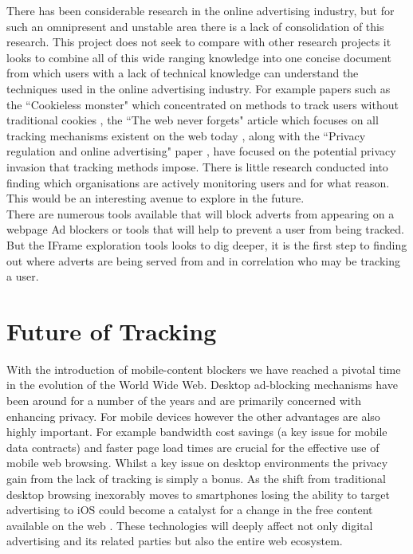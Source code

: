 \documentclass[12pt]{article}
\begin{document}
There has been considerable research in the online advertising industry, but for such an omnipresent and unstable area there is a lack of consolidation of this research. This project does not seek to compare with other research projects it looks to combine all of this wide ranging knowledge into one concise document from which users with a lack of technical knowledge can understand the techniques used in the online advertising industry. For example papers such as the ``Cookieless monster" which concentrated on methods to track users without traditional cookies \parencite{cookielessMonster}, the ``The web never forgets" article which focuses on all tracking mechanisms existent on the web today \parencite{webNeverForgets}, along with the ``Privacy regulation and online advertising" paper \parencite{goldfarb2011privacy}, have focused on the potential privacy invasion that tracking methods impose. There is little research conducted into finding which organisations are actively monitoring users and for what reason. This would be an interesting avenue to explore in the future.  \\

There are numerous tools available that will block adverts from appearing on a webpage Ad blockers or tools that will help to prevent a user from being tracked. But the IFrame exploration tools looks to dig deeper, it is the first step to finding out where adverts are being served from and in correlation who may be tracking a user. 

\pagebreak

\section{Future of Tracking} \label{futureTrack}
With the introduction of mobile-content blockers we have reached a pivotal time in the evolution of the World Wide Web. Desktop ad-blocking mechanisms have been around for a number of the years and are primarily concerned with enhancing privacy. For mobile devices however the other advantages are also highly important. For example bandwidth cost savings (a key issue for mobile data contracts) and faster page load times are crucial for the effective use of mobile web browsing. Whilst a key issue on desktop environments the privacy gain from the lack of tracking is simply a bonus. As the shift from traditional desktop browsing inexorably moves to smartphones losing the ability to target advertising to iOS could become a catalyst for a change in the free content available on the web \parencite{tippingPoint}. These technologies will deeply affect not only digital advertising and its related parties but also the entire web ecosystem. \\
\end{document}
